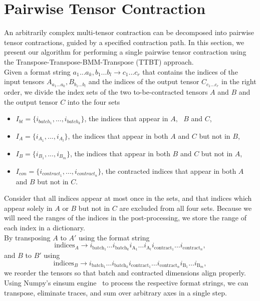\section{Pairwise Tensor Contraction}
An arbitrarily complex multi-tensor contraction can be decomposed into pairwise tensor contractions, guided by a specified
contraction path. In this section, we present our algorithm for performing a single pairwise tensor contraction using the Transpose-Transpose-BMM-Transpose (TTBT) approach.\\

\noindent Given a format string $a_1...a_k,b_1...b_l\rightarrow c_1...c_r$ that contains the indices of the input tensors $A_{a_1...a_k},B_{b_1...b_l}$ and the indices of the output tensor $C_{c_1...c_r}$ in the right order, we divide the index sets of the two to-be-contracted tensors $A$ and $B$ and the output tensor $C$ into the four sets
\begin{itemize}
    \item $I_{bt}= \{i_{{batch}_1},...,i_{{batch}_k}\}$, the indices that appear in $A, \text{ }B$ and $C$,
    \item $I_A=\{i_{{A}_1}, ...,i_{{A}_l}\}$, the indices that appear in both $A$ and $C$ but not in $B$,
    \item $I_B= \{i_{B_1} ,...,i_{B_m}\}$, the indices that appear in both $B$ and $C$ but not in $A$,
    \item $I_{con} = \{ i_{{contract}_1}, ..., i_{{contract}_n}\}$, the contracted indices that appear in both $A$ and $B$ but not in $C$.
\end{itemize}
Consider that all indices appear at most once in the sets, and that indices which appear solely in $A$ or $B$ but not in $C$ are excluded from all four sets. Because we will need the ranges of the indices in the post-processing, we store the range of each index in a dictionary.\\
By transposing $A$ to $A'$ using the format string  
$$\text{indices}_A \rightarrow i_{\text{batch}_1} \dots i_{\text{batch}_k} i_{\text{A}_1} \dots i_{\text{A}_l} i_{\text{contract}_1} \dots i_{\text{contract}_n},$$
and $B$ to $B'$ using  
$$\text{indices}_B \rightarrow i_{\text{batch}_1} \dots i_{\text{batch}_k} i_{\text{contract}_1} \dots i_{\text{contract}_n} i_{\text{B}_1} \dots i_{\text{B}_m},$$
\noindent we reorder the tensors so that batch and contracted dimensions align properly. Using Numpy’s einsum engine~\cite{Numpy} to process the respective format strings, we can transpose, eliminate traces, and sum over arbitrary axes in a single step.  \\

